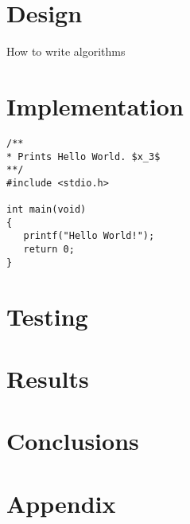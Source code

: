 \documentclass[a4paper,12pt]{article}
\begin{document}
\section{Design}

\begin{algorithm}[H]
\caption{How to write algorithms}
\label{alg:algorithm1}
\end{algorithm}

\section{Implementation}

\begin{lstlisting}
/**
* Prints Hello World. $x_3$
**/
#include <stdio.h>

int main(void) 
{
   printf("Hello World!");
   return 0;
}
\end{lstlisting}

\section{Testing}

\section{Results}

\section{Conclusions}

\pagebreak
{}
\nocite{*}


\pagebreak
{}
\section*{Appendix}
\end{document}
